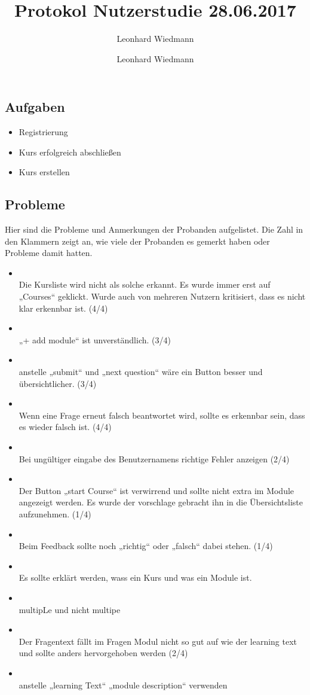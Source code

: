 \documentclass[colorback, accentcolor=tud1c, paper=a4]{tudexercise}
\title{Protokol Nutzerstudie 28.06.2017}
\subtitle{Leonhard Wiedmann}
\author{Leonhard Wiedmann}
\begin{document}
\maketitle
\subsection*{Aufgaben}
	\begin{itemize}
	\item Registrierung
  \item Kurs erfolgreich abschließen
  \item Kurs erstellen
	\end{itemize}

\subsection*{Probleme}
  Hier sind die Probleme und Anmerkungen der Probanden aufgelistet. Die Zahl in den Klammern zeigt an, wie viele der Probanden es gemerkt haben oder Probleme damit hatten.
  \begin{itemize}
    \item \\ Die Kursliste wird nicht als solche erkannt. Es wurde immer erst auf „Courses“ geklickt. Wurde auch von mehreren Nutzern kritisiert, dass es nicht klar erkennbar ist. (4/4)
    \item \\ „+ add module“ ist unverständlich. (3/4)
    \item \\ anstelle „submit“ und „next question“ wäre ein Button besser und übersichtlicher. (3/4)
    \item \\ Wenn eine Frage erneut falsch beantwortet wird, sollte es erkennbar sein, dass es wieder falsch ist. (4/4)
    \item \\ Bei ungültiger eingabe des Benutzernamens richtige Fehler anzeigen (2/4)
    \item \\ Der Button „start Course“ ist verwirrend und sollte nicht extra im Module angezeigt werden. Es wurde der vorschlage gebracht ihn in die Übersichtsliste aufzunehmen. (1/4)
    \item \\ Beim Feedback sollte noch „richtig“ oder „falsch“ dabei stehen. (1/4)
    \item \\ Es sollte erklärt werden, wass ein Kurs und was ein Module ist.
    \item \\ multipLe und nicht multipe
    \item \\ Der Fragentext fällt im Fragen Modul nicht so gut auf wie der learning text und sollte anders hervorgehoben werden (2/4)
    \item \\ anstelle „learning Text“ „module description“ verwenden
   \end{itemize}
\end{document}
